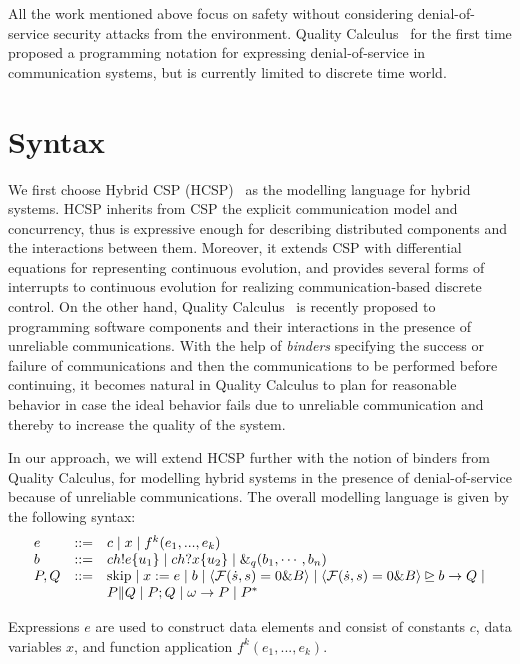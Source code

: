 \documentclass{llncs}
\newcommand{\pskip}{\textmd{skip}}
\newcommand{\evolution}[3]{\langle \mathcal{#1}(\dot{#2},#2)=0 \& #3\rangle}
\newcommand{\bexempt}[3]{#1 \unrhd #2 \rightarrow #3}
\begin{document}
All the work mentioned above focus on safety without considering denial-of-service security attacks from
the environment.
Quality Calculus~\cite{RNV12,HNN13} for the first time proposed a programming notation for expressing
denial-of-service in communication systems, but is currently limited to discrete time world.



\section{Syntax}
\label{sec:syntax}
 We first choose Hybrid CSP (HCSP)~\cite{Jifeng:1994,Zhou:1996} as the modelling language
 for hybrid systems.
 HCSP inherits from CSP the explicit communication model and concurrency, thus is expressive enough for describing
  distributed components and the interactions between them. Moreover, it extends CSP with differential
equations for representing continuous evolution, and provides several forms of interrupts to continuous evolution for
realizing communication-based discrete control.
On the other hand, Quality Calculus~\cite{RNV12,HNN13} is recently proposed to programming software components and their interactions in the presence
of unreliable communications. With the help of  \emph{binders} specifying the success or failure of communications and then the
communications to be performed before continuing,
it becomes natural in Quality Calculus to plan for reasonable behavior  in case the ideal
behavior fails due to unreliable communication and thereby to increase the quality of  the system.

In our approach, we will extend HCSP further with the notion of binders from Quality Calculus,
for modelling hybrid systems in the presence of denial-of-service because of unreliable communications.
The overall modelling language is given by the following syntax:
\vspace{-0.5em}
 \[
\begin{array}{lll}
e &::=& c  \mid x \mid f^k(e_1, ..., e_k)\\
 b &::=& ch!e\{u_1\} \mid ch?x\{u_2\} \mid \&_q(b_1, \cdots, b_n)\\
 P, Q  & ::= & \pskip \mid  x :=e  \mid b \mid  \evolution{F}{s}{B} \mid \bexempt{\evolution{F}{s}{B}}{b}{Q} \mid \\
      &&P\|Q \mid P;Q  \mid \omega \rightarrow P\mid  P^*
 \end{array}
 \]

Expressions $e$ are used to construct data elements and consist of constants $c$,
data variables $x$, and function application $f^k(e_1, ..., e_k)$.
\end{document}
